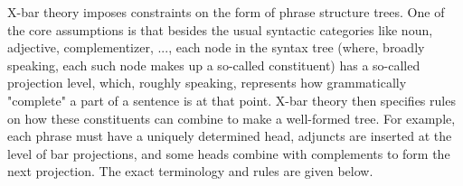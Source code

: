 

\usepackage[linguistics]{forest} %


	
\def \sheetnr {09}
\def \sheettitle {Trees and X-bar theory:\\Theoretical background}
\def \handedout {Monday 22\textsuperscript{nd} July, 14:00}
\def \tosubmit {Monday 29\textsuperscript{th} July, 14:00}
\def \totalpoints {8}
\setuptitle

X-bar theory imposes constraints on the form of phrase structure trees. One of the core assumptions is that besides the usual syntactic categories like noun, adjective, complementizer, ..., each node in the syntax tree (where, broadly speaking, each such node makes up a so-called constituent) has a so-called projection level, which, roughly speaking, represents how grammatically "complete" a part of a sentence is at that point. X-bar theory then specifies rules on how these constituents can combine to make a well-formed tree. For example, each phrase must have a uniquely determined head, adjuncts are inserted at the level of bar projections, and some heads combine with complements to form the next projection. The exact terminology and rules are given below.\\

